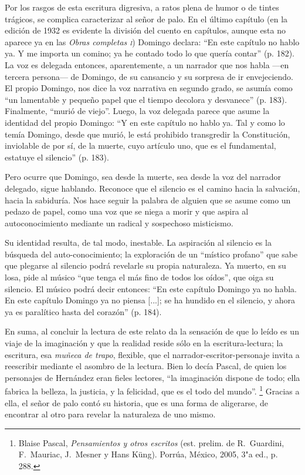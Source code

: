 \documentclass[14pt,twoside,final]{extbook} %
\let\oldfootnote\footnote
\renewcommand\footnote[1]{%
\oldfootnote{\hspace{1mm}#1}}
\begin{document}
Por los rasgos de esta escritura digresiva, a ratos plena de humor o de tintes trágicos, se complica caracterizar al señor de palo. En el último capítulo (en la edición de 1932 es evidente la división del cuento en capítulos, aunque esta no aparece ya en las \emph{Obras completas \textsc{i}}) Domingo declara: ``En este capítulo no hablo ya. Y me importa un comino; ya he contado todo lo que quería contar'' (p. 182). La voz es delegada entonces, aparentemente, a un narrador que nos habla ---en tercera persona--- de Domingo, de su cansancio y su sorpresa de ir envejeciendo. El propio Domingo, nos dice la voz narrativa en segundo grado, se asumía como ``un lamentable y pequeño papel que el tiempo decolora y desvanece'' (p. 183). Finalmente, ``murió de viejo''. Luego, la voz delegada parece que asume la identidad del propio Domingo: ``Y en este capítulo no hablo ya. Tal y como lo temía Domingo, desde que murió, le está prohibido transgredir la Constitución, inviolable de por sí, de la muerte, cuyo artículo uno, que es el fundamental, estatuye el silencio'' (p. 183).

Pero ocurre que Domingo, sea desde la muerte, sea desde la voz del narrador delegado, sigue hablando. Reconoce que el silencio es el camino hacia la salvación, hacia la sabiduría. Nos hace seguir la palabra de alguien que se asume como un pedazo de papel, como una voz que se niega a morir y que aspira al autoconocimiento mediante un radical y sospechoso misticismo.

Su identidad resulta, de tal modo, inestable. La aspiración al silencio es la búsqueda del auto-conocimiento; la exploración de un ``místico profano'' que sabe que plegarse al silencio podrá revelarle su propia naturaleza. Ya muerto, en su losa, pide al músico ``que tenga el más fino de todos los oídos'', que oiga su silencio. El músico podrá decir entonces: ``En este capítulo Domingo ya no habla. En este capítulo Domingo ya no piensa [...]; se ha hundido en el silencio, y ahora ya es
paralítico hasta del corazón'' (p. 184).

En suma, al concluir la lectura de este relato da la sensación de que lo leído es un viaje de la imaginación y que la realidad reside sólo en la escritura-lectura; la escritura, esa \emph{muñeca de trapo}, flexible, que el narrador-escritor-personaje invita a reescribir mediante el asombro de la lectura. Bien lo decía Pascal, de quien los personajes de Hernández eran fieles lectores, ``la imaginación dispone de todo; ella fabrica la belleza, la justicia, y la felicidad, que es el todo del mundo''.\footnote{Blaise Pascal, \emph{Pensamientos y otros escritos} (est. prelim. de R.~Guardini, F.~Mauriac, J.~Mesner y Hans Küng). Porrúa, México, 2005, 3"a ed., p. 288.} Gracias a ella, el señor de palo contó su historia, que es una forma de aligerarse, de encontrar al otro para revelar la naturaleza de uno mismo.
\end{document}
